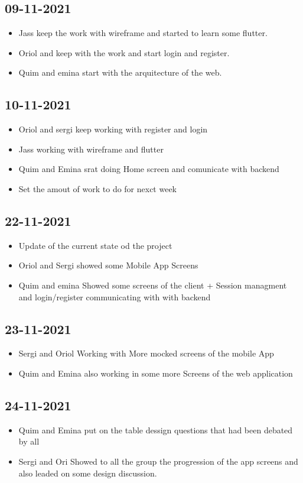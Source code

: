 \documentclass[./main.tex]{subfiles}
\begin{document}
\subsection{09-11-2021}
\begin{itemize}
\item Jass keep the work with wireframe and started to learn some flutter.
\item Oriol and keep with the work and start login and register.
\item Quim and emina start with the arquitecture of the web.
\end{itemize}


\subsection{10-11-2021}
\begin{itemize}
\item Oriol and sergi keep working with register and login
\item Jass working with wireframe and flutter
\item Quim and Emina srat doing Home screen and comunicate with backend
\item Set the amout of work to do for nexct week
\end{itemize}

\subsection{22-11-2021}
\begin{itemize}
\item Update of the current state od the project
\item Oriol and Sergi showed some Mobile App Screens
\item Quim and emina Showed some screens of the client + Session managment and login/register communicating with with backend
\end{itemize}

\subsection{23-11-2021}
\begin{itemize}
\item Sergi and Oriol Working with More mocked screens of the mobile App
\item Quim and Emina also working in some more Screens of the web application
\end{itemize}

\subsection{24-11-2021}
\begin{itemize}
  \item Quim and Emina put on the table dessign questions that had been debated by all
  \item Sergi and Ori Showed to all the group the progression of the app screens and also leaded on some design discussion.
\end{itemize}
\end{document}

